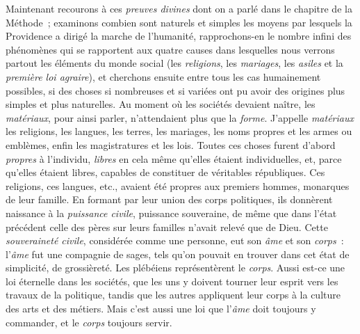 \documentclass[french,twoside]{book} %
\begin{document}
Maintenant recourons à ces {\itshape preuves divines} dont on a parlé dans le chapitre de la Méthode ; examinons combien sont naturels et simples les moyens par lesquels la Providence a dirigé la marche de l’humanité, rapprochons-en le nombre infini des phénomènes qui se rapportent aux quatre causes dans lesquelles nous verrons partout les éléments du monde social (les {\itshape religions}, les {\itshape mariages}, les {\itshape asiles} et la {\itshape première loi agraire}), et cherchons ensuite entre tous les cas humainement possibles, si des choses si nombreuses et si variées ont pu avoir des origines plus simples et plus naturelles. Au moment où les sociétés devaient naître, les {\itshape matériaux}, pour ainsi parler, n’attendaient plus que la {\itshape forme}. J’appelle {\itshape matériaux} les religions, les langues, les terres, les mariages, les noms propres et les armes ou emblèmes, enfin les magistratures et les lois. Toutes ces choses furent d’abord {\itshape propres} à l’individu, {\itshape libres} en cela même qu’elles étaient individuelles, et, parce qu’elles étaient libres, capables de constituer de véritables républiques. Ces religions, ces langues, etc., avaient été propres aux premiers hommes, monarques de leur famille. En formant par leur union des corps politiques, ils donnèrent naissance à la {\itshape puissance civile}, puissance souveraine, de même que dans l’état précédent celle des pères sur leurs familles n’avait relevé que de Dieu. Cette {\itshape souveraineté civile}, considérée comme  une personne, eut son {\itshape âme} et son {\itshape corps} : l’{\itshape âme} fut une compagnie de sages, tels qu’on pouvait en trouver dans cet état de simplicité, de grossièreté. Les plébéiens représentèrent le {\itshape corps}. Aussi est-ce une loi éternelle dans les sociétés, que les uns y doivent tourner leur esprit vers les travaux de la politique, tandis que les autres appliquent leur corps à la culture des arts et des métiers. Mais c’est aussi une loi que l’{\itshape âme} doit toujours y commander, et le {\itshape corps} toujours servir.\par
\end{document}
